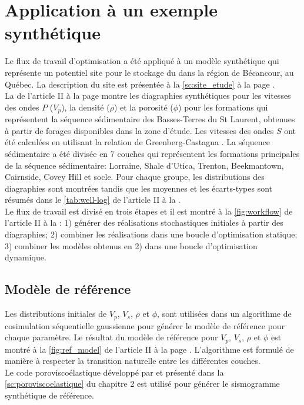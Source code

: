 \section{Application à un exemple synthétique}
\label{sc:application}
Le flux de travail d'optimisation a été appliqué à un modèle synthétique qui
représente un potentiel site pour le stockage du  dans la région de
Bécancour, au Québec. La description du site est présentée à la
\cref{sc:site_etude} à la page . \\
La  de l'article II à la page  montre
les diagraphies synthétiques pour les vitesses des ondes $P$ ($V_p$), la densité
($\rho$) et la porosité ($\phi$) pour les formations qui représentent la
séquence
sédimentaire des Basses-Terres du St Laurent, obtenues à partir de forages
disponibles dans la zone d'étude. Les vitesses des ondes $S$ ont été calculées
en utilisant la relation de Greenberg-Castagna \citep{Greenberg1992}.
La séquence sédimentaire a été divisée en 7 couches qui représentent les
formations principales de la séquence sédimentaire: Lorraine, Shale d'Utica,
Trenton, Beekmantown, Cairnside, Covey Hill et socle. Pour chaque groupe, les
distributions des diagraphies sont montrées tandis que les moyennes et les
écarts-types sont résumés dans le \cref{tab:well-log} de l'article II à la
.\\
Le flux de
travail est divisé en trois étapes et il est montré à la \cref{fig:workflow} de
l'article II à la : 1) générer des réalisations
stochastiques initiales à partir des diagraphies; 2) combiner les réalisations
dans une boucle d’optimisation statique; 3) combiner les modèles obtenus en 2)
dans une boucle d'optimisation dynamique.
\subsection{Modèle de référence}
Les distributions initiales de $V_p$, $V_s$, $\rho$ et $\phi$, sont utilisées
dans un algorithme de cosimulation séquentielle gaussienne  pour générer le
modèle de référence pour chaque paramètre. Le résultat du modèle de référence
pour $V_p$, $V_s$, $\rho$ et $\phi$ est montré à la \cref{fig:ref_model} de
l'article II à la page . L'algorithme est formulé de
manière à respecter la transition naturelle entre les différentes couches. \\
Le code poroviscoélastique développé par \citet{Giroux2012} et présenté dans la
\cref{sc:poroviscoelastique} du chapitre 2 est utilisé pour générer le
sismogramme synthétique de référence.
